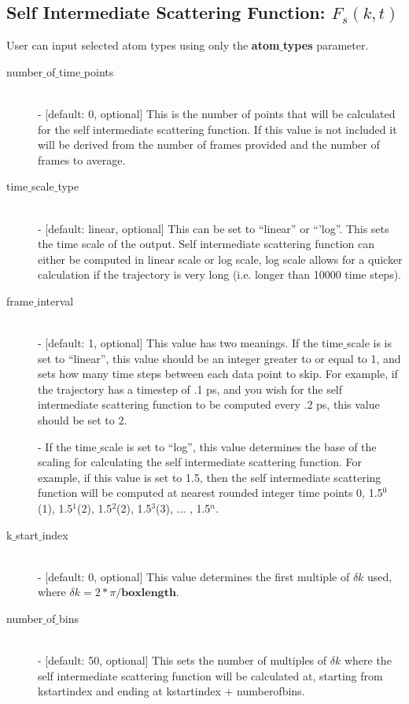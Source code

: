 \documentclass{article}
\begin{document}
\subsection{Self Intermediate Scattering Function: $F_s(k,t)$} \label{sec::Fsqt_parm}
User can input selected atom types using only the \textbf{atom$\_$types} parameter.
\begin{description}	
	\item[number$\_$of$\_$time$\_$points]\hfill \\
	- [default: 0, optional] This is the number of points that will be calculated for the self intermediate scattering function.  If this value is not included it will be derived from the number of frames provided and the number of frames to average.
	
	\item[time$\_$scale$\_$type] \hfill \\
	- [default: linear, optional] This can be set to ``linear'' or ``'log''.  This sets the time scale of the output. Self intermediate scattering function can either be computed in linear scale or log scale, log scale allows for a quicker calculation if the trajectory is very long (i.e. longer than 10000 time steps).
	
	\item[frame$\_$interval] \hfill \\
	- [default: 1, optional] This value has two meanings.  If the time$\_$scale is is set to ``linear'', this value should be an integer greater to or equal to 1, and sets how many time steps between each data point to skip.  For example, if the trajectory has a timestep of .1 ps, and you wish for the self intermediate scattering function to be computed every .2 ps, this value should be set to 2. 
	
	- If the time$\_$scale is set to ``log'', this value determines the base of the scaling for calculating the self intermediate scattering function.  For example, if this value is set to 1.5, then the self intermediate scattering function will be computed at nearest rounded integer time points 0, 1.5$^0$(1), 1.5$^1$(2), 1.5$^2$(2), 1.5$^3$(3), ... , 1.5$^{n}$.
	
	\item[k$\_$start$\_$index] \hfill \\
	- [default: 0, optional] This value determines the first multiple of $\delta k$ used, where $\delta k = 2*\pi/\textbf{boxlength}$.  
	
	\item[number$\_$of$\_$bins] \hfill \\
	- [default: 50, optional] This sets the number of multiples of $\delta k$ where the self intermediate scattering function will be calculated at, starting from kstartindex and ending at kstartindex + numberofbins. 	
	
\end{description}
\end{document}
